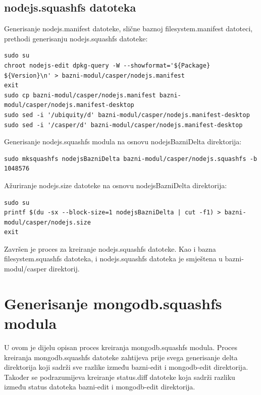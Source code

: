 \documentclass[12pt,vi]{mitthesis}
\begin{document}
\subsection*{nodejs.squashfs datoteka}
\indent
Generisanje nodejs.manifest datoteke, slične baznoj filesystem.manifest datoteci, prethodi generisanju nodejs.squashfs datoteke:
\begin{lstlisting}[style=BashInputStyle]
sudo su
chroot nodejs-edit dpkg-query -W --showformat='${Package} ${Version}\n' > bazni-modul/casper/nodejs.manifest
exit
sudo cp bazni-modul/casper/nodejs.manifest bazni-modul/casper/nodejs.manifest-desktop
sudo sed -i '/ubiquity/d' bazni-modul/casper/nodejs.manifest-desktop
sudo sed -i '/casper/d' bazni-modul/casper/nodejs.manifest-desktop
\end{lstlisting}
\indent
Generisanje nodejs.squashfs modula na osnovu nodejsBazniDelta direktorija:
\begin{lstlisting}[style=BashInputStyle]
sudo mksquashfs nodejsBazniDelta bazni-modul/casper/nodejs.squashfs -b 1048576
\end{lstlisting}
\noindent
Ažuriranje nodejs.size datoteke na osnovu nodejsBazniDelta direktorija:
\begin{lstlisting}[style=BashInputStyle]
sudo su
printf $(du -sx --block-size=1 nodejsBazniDelta | cut -f1) > bazni-modul/casper/nodejs.size
exit
\end{lstlisting}
Završen je proces za kreiranje nodejs.squashfs datoteke. Kao i bazna filesystem.squashfs datoteka, i nodejs.squashfs datoteka je smještena u bazni-modul/casper direktorij.
\section*{Generisanje mongodb.squashfs modula}
\indent
U ovom je dijelu opisan proces kreiranja mongodb.squashfs modula. Proces kreiranja mongodb.squashfs datoteke zahtijeva prije svega generisanje delta direktorija koji sadrži sve razlike između bazni-edit i mongodb-edit direktorija. Također se podrazumijeva kreiranje status.diff datoteke koja sadrži razliku između status datoteka bazni-edit i mongodb-edit direktorija.\\
\end{document}
